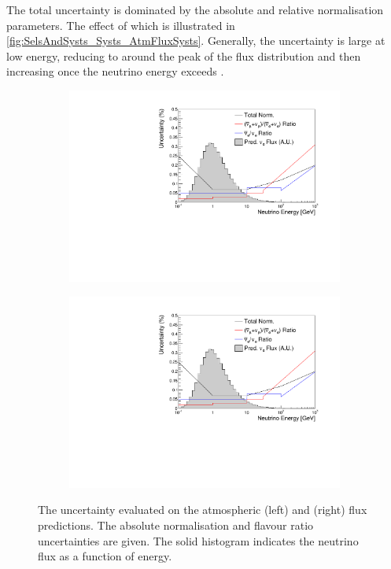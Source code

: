 The total uncertainty is dominated by the absolute and relative normalisation parameters. The effect of which is illustrated in \autoref{fig:SelsAndSysts_Systs_AtmFluxSysts}. Generally, the uncertainty is large at low energy, reducing to  around the peak of the flux distribution and then increasing once the neutrino energy exceeds .

\begin{figure}[h]
  \begin{subfigure}[t]{0.49\textwidth}
    \includegraphics[width=\textwidth, trim={0mm 0mm 0mm 0mm}, clip,page=1]{Figures/Selections/AtmFluxSystSize.pdf}
  \end{subfigure}%
  \begin{subfigure}[t]{0.49\textwidth}
    \includegraphics[width=\textwidth, trim={0mm 0mm 0mm 0mm}, clip,page=3]{Figures/Selections/AtmFluxSystSize.pdf}
  \end{subfigure}
  \caption{The uncertainty evaluated on the atmospheric  (left) and \quickmath{\nu_{\mu}} (right) flux predictions. The absolute normalisation and flavour ratio uncertainties are given. The solid histogram indicates the neutrino flux as a function of energy.}
  \label{fig:SelsAndSysts_Systs_AtmFluxSysts}
\end{figure}

